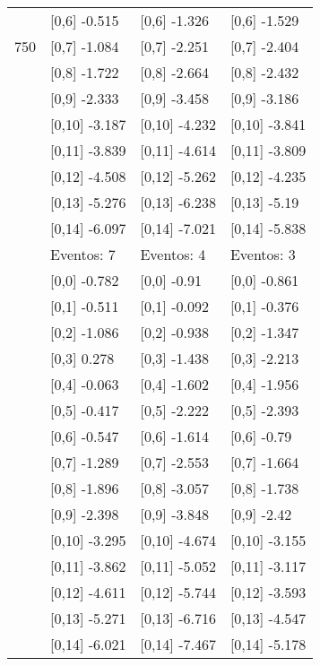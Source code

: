 \begin{table}
\begin{tabular}[t]{llll}
 & {}[0,6] -0.515 & {}[0,6] -1.326 & {}[0,6] -1.529\\
750 & {}[0,7] -1.084 & {}[0,7] -2.251 & {}[0,7] -2.404\\
\addlinespace
 & {}[0,8] -1.722 & {}[0,8] -2.664 & {}[0,8] -2.432\\
 & {}[0,9] -2.333 & {}[0,9] -3.458 & {}[0,9] -3.186\\
 & {}[0,10] -3.187 & {}[0,10] -4.232 & {}[0,10] -3.841\\
 & {}[0,11] -3.839 & {}[0,11] -4.614 & {}[0,11] -3.809\\
 & {}[0,12] -4.508 & {}[0,12] -5.262 & {}[0,12] -4.235\\
\addlinespace
 & {}[0,13] -5.276 & {}[0,13] -6.238 & {}[0,13] -5.19\\
 & {}[0,14] -6.097 & {}[0,14] -7.021 & {}[0,14] -5.838\\
 & Eventos:  7 & Eventos:  4 & Eventos:  3\\
 & {}[0,0] -0.782 & {}[0,0] -0.91 & {}[0,0] -0.861\\
 & {}[0,1] -0.511 & {}[0,1] -0.092 & {}[0,1] -0.376\\
\addlinespace
 & {}[0,2] -1.086 & {}[0,2] -0.938 & {}[0,2] -1.347\\
 & {}[0,3] 0.278 & {}[0,3] -1.438 & {}[0,3] -2.213\\
 & {}[0,4] -0.063 & {}[0,4] -1.602 & {}[0,4] -1.956\\
 & {}[0,5] -0.417 & {}[0,5] -2.222 & {}[0,5] -2.393\\
 & {}[0,6] -0.547 & {}[0,6] -1.614 & {}[0,6] -0.79\\
\addlinespace
1000 & {}[0,7] -1.289 & {}[0,7] -2.553 & {}[0,7] -1.664\\
 & {}[0,8] -1.896 & {}[0,8] -3.057 & {}[0,8] -1.738\\
 & {}[0,9] -2.398 & {}[0,9] -3.848 & {}[0,9] -2.42\\
 & {}[0,10] -3.295 & {}[0,10] -4.674 & {}[0,10] -3.155\\
 & {}[0,11] -3.862 & {}[0,11] -5.052 & {}[0,11] -3.117\\
\addlinespace
 & {}[0,12] -4.611 & {}[0,12] -5.744 & {}[0,12] -3.593\\
 & {}[0,13] -5.271 & {}[0,13] -6.716 & {}[0,13] -4.547\\
 & {}[0,14] -6.021 & {}[0,14] -7.467 & {}[0,14] -5.178\\
\bottomrule
\end{tabular}
\end{table}
